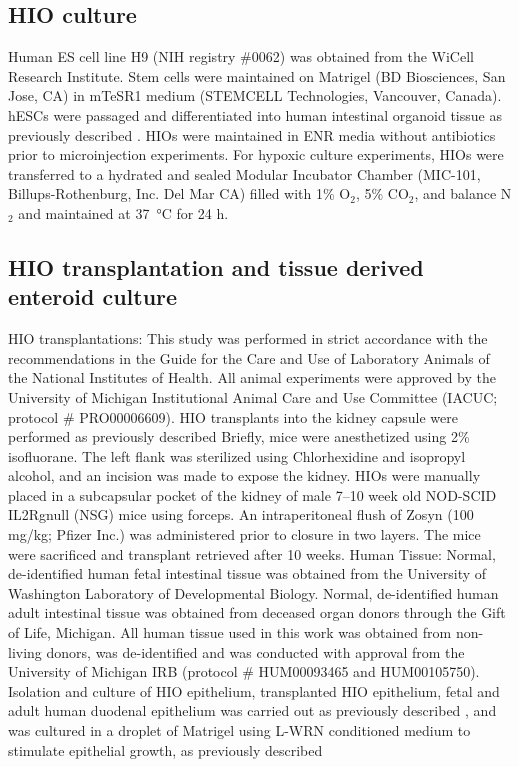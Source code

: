 \documentclass[9pt,lineo]{elife}
\begin{document}
\subsection*{{\bfseries\sffamily } HIO culture}
\label{sec:orgheadline12}
Human ES cell line  H9 (NIH registry \#0062) was obtained from the WiCell Research Institute. Stem cells were maintained on Matrigel (BD Biosciences, San Jose, CA) in mTeSR1 medium (STEMCELL Technologies, Vancouver, Canada). hESCs were passaged and differentiated into human intestinal organoid tissue as previously described \citep{Spence:2011,McCracken:2011}. HIOs were maintained in ENR media without antibiotics prior to microinjection experiments.
For hypoxic culture experiments, HIOs were transferred to a hydrated and sealed Modular Incubator Chamber (MIC-101, Billups-Rothenburg, Inc. Del Mar CA) filled with 1\% O\(_{\text{2}}\), 5\% CO\(_{\text{2}}\), and balance N\(_{\text{2}}\) and maintained at \SI{37}{\celsius} for 24 h.
\subsection*{{\bfseries\sffamily } HIO transplantation and tissue derived enteroid culture}
\label{sec:orgheadline13}
HIO transplantations: This study was performed in strict accordance with the recommendations in the Guide for the Care and Use of Laboratory Animals of the National Institutes of Health. All animal experiments were approved by the University of Michigan Institutional Animal Care and Use Committee (IACUC; protocol \# PRO00006609). HIO transplants into the kidney capsule were performed as previously described \citep{Finkbeiner:2015,Dye:2016} Briefly, mice were anesthetized using 2\% isofluorane. The left flank was sterilized using Chlorhexidine and isopropyl alcohol, and an incision was made to expose the kidney. HIOs were manually placed in a subcapsular pocket of the kidney of male 7–10 week old NOD-SCID IL2Rgnull (NSG) mice using forceps. An intraperitoneal flush of Zosyn (100 mg/kg; Pfizer Inc.) was administered prior to closure in two layers. The mice were sacrificed and transplant retrieved after 10 weeks. 
Human Tissue: Normal, de-identified human fetal intestinal tissue was obtained from the University of Washington Laboratory of Developmental Biology. Normal, de-identified human adult intestinal tissue was obtained from deceased organ donors through the Gift of Life, Michigan. All human tissue used in this work was obtained from non-living donors, was de-identified and was conducted with approval from the University of Michigan IRB (protocol \# HUM00093465 and HUM00105750).  Isolation and culture of HIO epithelium, transplanted HIO epithelium, fetal and adult human duodenal epithelium was carried out as previously described \citep{Finkbeiner:2015}, and was cultured in a droplet of Matrigel using L-WRN conditioned medium to stimulate epithelial growth, as previously described \citep{Miyoshi:2012,Miyoshi:2013}
\end{document}
